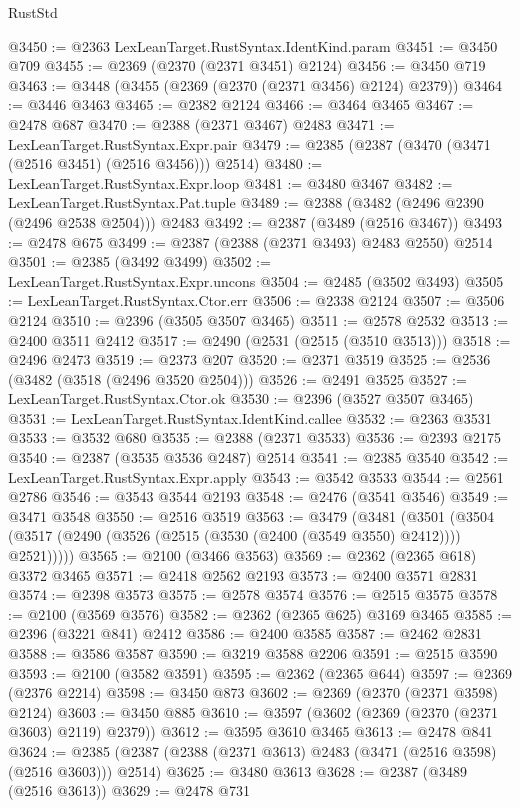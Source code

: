 \begin{lexlean}{RustStd}
\begin{coremodule}
@3450 := @2363 LexLeanTarget.RustSyntax.IdentKind.param
@3451 := @3450 @709
@3455 := @2369 (@2370 (@2371 @3451) @2124)
@3456 := @3450 @719
@3463 := @3448 (@3455 (@2369 (@2370 (@2371 @3456) @2124) @2379))
@3464 := @3446 @3463
@3465 := @2382 @2124
@3466 := @3464 @3465
@3467 := @2478 @687
@3470 := @2388 (@2371 @3467) @2483
@3471 := LexLeanTarget.RustSyntax.Expr.pair
@3479 := @2385 (@2387 (@3470 (@3471 (@2516 @3451) (@2516 @3456))) @2514)
@3480 := LexLeanTarget.RustSyntax.Expr.loop
@3481 := @3480 @3467
@3482 := LexLeanTarget.RustSyntax.Pat.tuple
@3489 := @2388 (@3482 (@2496 @2390 (@2496 @2538 @2504))) @2483
@3492 := @2387 (@3489 (@2516 @3467))
@3493 := @2478 @675
@3499 := @2387 (@2388 (@2371 @3493) @2483 @2550) @2514
@3501 := @2385 (@3492 @3499)
@3502 := LexLeanTarget.RustSyntax.Expr.uncons
@3504 := @2485 (@3502 @3493)
@3505 := LexLeanTarget.RustSyntax.Ctor.err
@3506 := @2338 @2124
@3507 := @3506 @2124
@3510 := @2396 (@3505 @3507 @3465)
@3511 := @2578 @2532
@3513 := @2400 @3511 @2412
@3517 := @2490 (@2531 (@2515 (@3510 @3513)))
@3518 := @2496 @2473
@3519 := @2373 @207
@3520 := @2371 @3519
@3525 := @2536 (@3482 (@3518 (@2496 @3520 @2504)))
@3526 := @2491 @3525
@3527 := LexLeanTarget.RustSyntax.Ctor.ok
@3530 := @2396 (@3527 @3507 @3465)
@3531 := LexLeanTarget.RustSyntax.IdentKind.callee
@3532 := @2363 @3531
@3533 := @3532 @680
@3535 := @2388 (@2371 @3533)
@3536 := @2393 @2175
@3540 := @2387 (@3535 @3536 @2487) @2514
@3541 := @2385 @3540
@3542 := LexLeanTarget.RustSyntax.Expr.apply
@3543 := @3542 @3533
@3544 := @2561 @2786
@3546 := @3543 @3544 @2193
@3548 := @2476 (@3541 @3546)
@3549 := @3471 @3548
@3550 := @2516 @3519
@3563 := @3479
    (@3481
      (@3501 (@3504 (@3517 (@2490 (@3526 (@2515 (@3530 (@2400 (@3549 @3550) @2412)))) @2521)))))
@3565 := @2100 (@3466 @3563)
@3569 := @2362 (@2365 @618) @3372 @3465
@3571 := @2418 @2562 @2193
@3573 := @2400 @3571 @2831
@3574 := @2398 @3573
@3575 := @2578 @3574
@3576 := @2515 @3575
@3578 := @2100 (@3569 @3576)
@3582 := @2362 (@2365 @625) @3169 @3465
@3585 := @2396 (@3221 @841) @2412
@3586 := @2400 @3585
@3587 := @2462 @2831
@3588 := @3586 @3587
@3590 := @3219 @3588 @2206
@3591 := @2515 @3590
@3593 := @2100 (@3582 @3591)
@3595 := @2362 (@2365 @644)
@3597 := @2369 (@2376 @2214)
@3598 := @3450 @873
@3602 := @2369 (@2370 (@2371 @3598) @2124)
@3603 := @3450 @885
@3610 := @3597 (@3602 (@2369 (@2370 (@2371 @3603) @2119) @2379))
@3612 := @3595 @3610 @3465
@3613 := @2478 @841
@3624 := @2385 (@2387 (@2388 (@2371 @3613) @2483 (@3471 (@2516 @3598) (@2516 @3603))) @2514)
@3625 := @3480 @3613
@3628 := @2387 (@3489 (@2516 @3613))
@3629 := @2478 @731

\end{coremodule}
\end{lexlean}
